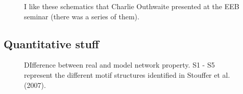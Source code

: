 \documentclass[
  letterpaper,
  DIV=11,
  numbers=noendperiod]{scrartcl}
\begin{document}
\begin{figure}


\caption{\label{fig-outhwaite}I like these schematics that Charlie
Outhwaite presented at the EEB seminar (there was a series of them).}

\end{figure}%

\subsection{Quantitative stuff}\label{quantitative-stuff}

\begin{figure}[H]


\caption{\label{fig-topology}DIfference between real and model network
property. S1 - S5 represent the different motif structures identified in
Stouffer et al. (2007).}

\end{figure}%
\end{document}
